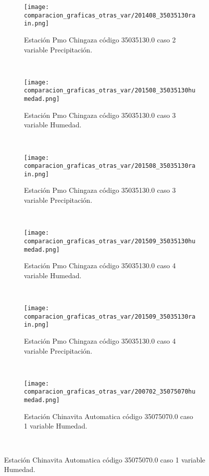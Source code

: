 \begin{figure}[H]
\centering
\begin{subfigure}[normla]{0.4\textwidth}
\caption{Estación Pmo Chingaza código 35035130.0 caso 2 variable Precipitación.}
\texttt{[image: comparacion\_graficas\_otras\_var/201408\_35035130rain.png]}
\end{subfigure}
~
\begin{subfigure}[normla]{0.4\textwidth}
\caption{Estación Pmo Chingaza código 35035130.0 caso 3 variable Humedad.}
\texttt{[image: comparacion\_graficas\_otras\_var/201508\_35035130humedad.png]}
\end{subfigure}
~
\begin{subfigure}[normla]{0.4\textwidth}
\caption{Estación Pmo Chingaza código 35035130.0 caso 3 variable Precipitación.}
\texttt{[image: comparacion\_graficas\_otras\_var/201508\_35035130rain.png]}
\end{subfigure}
~
\begin{subfigure}[normla]{0.4\textwidth}
\caption{Estación Pmo Chingaza código 35035130.0 caso 4 variable Humedad.}
\texttt{[image: comparacion\_graficas\_otras\_var/201509\_35035130humedad.png]}
\end{subfigure}
~
\begin{subfigure}[normla]{0.4\textwidth}
\caption{Estación Pmo Chingaza código 35035130.0 caso 4 variable Precipitación.}
\texttt{[image: comparacion\_graficas\_otras\_var/201509\_35035130rain.png]}
\end{subfigure}
~
\begin{subfigure}[normla]{0.4\textwidth}
\caption{Estación Chinavita Automatica código 35075070.0 caso 1 variable Humedad.}
\texttt{[image: comparacion\_graficas\_otras\_var/200702\_35075070humedad.png]}
\end{subfigure}
~
\end{figure}
           
